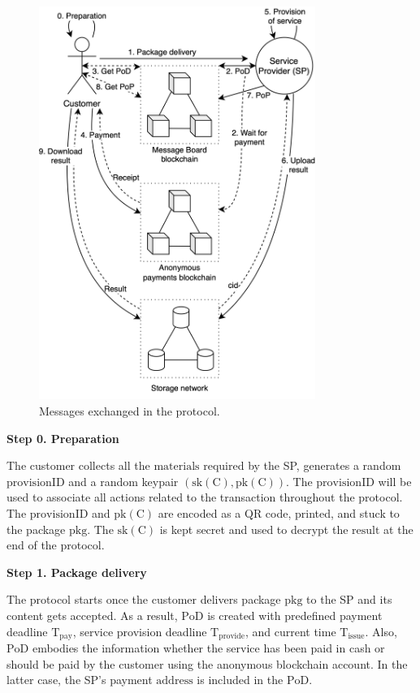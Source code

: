 \begin{figure}[ht!]
\includegraphics[width=9cm]{anonser-protocol.png}
\centering
\caption{Messages exchanged in the protocol.}
\label{fig:protocol-diagram}
\end{figure}

\noindent \textbf
{Step 0.  Preparation}\label{step-0-preparation}

The customer collects all the $\mathrm{materials}$ required by the SP, generates a random $\mathrm{provisionID}$ and a random keypair $(\mathrm{sk(C)},\mathrm{pk(C)})$. The $\mathrm{provisionID}$ will be used to associate all actions related to the transaction throughout the protocol. The $\mathrm{provisionID}$ and $\mathrm{pk(C)}$ are encoded as a QR code, printed, and stuck to the package $\mathrm{pkg}$. The $\mathrm{sk(C)}$ is kept secret and used to decrypt the $\mathrm{result}$ at the end of the protocol.

\noindent \textbf
{Step 1. Package delivery}\label{step-1-package-delivery}

The protocol starts once the customer delivers package $\mathrm{pkg}$ to the SP and its content gets accepted. As a result, $\mathrm{PoD}$ is created with predefined payment deadline $\mathrm{T}_\mathrm{pay}$, service provision deadline $\mathrm{T}_\mathrm{provide}$, and current time $\mathrm{T}_\mathrm{issue}$. Also, $\mathrm{PoD}$ embodies the information whether the service has been paid in cash or should be paid by the customer using the anonymous blockchain account. In the latter case, the SP's payment $\mathrm{address}$ is included in the $\mathrm{PoD}$.

